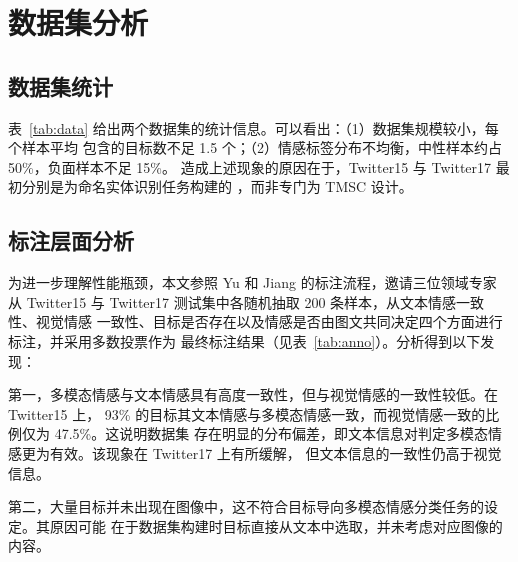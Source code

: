 \documentclass[12pt]{ctexart}
\begin{document}
\clearpage
\section{数据集分析}
\subsection{数据集统计}
表~\ref{tab:data} 给出两个数据集的统计信息。可以看出：（1）数据集规模较小，每个样本平均
包含的目标数不足 1.5 个；（2）情感标签分布不均衡，中性样本约占 50\%，负面样本不足 15\%。
造成上述现象的原因在于，Twitter15 与 Twitter17 最初分别是为命名实体识别任务构建的
\cite{zhang2018,lu2018}，而非专门为 TMSC 设计\cite{ye2023}。

\begin{table}[htbp]
\centering
\caption{两个数据集的统计信息（“均目标”指每个样本的平均目标数）\cite{ye2023}}
\label{tab:data}
\scriptsize
{}
\end{table}

\subsection{标注层面分析}
为进一步理解性能瓶颈，本文参照 Yu 和 Jiang\cite{yu2019} 的标注流程，邀请三位领域专家
从 Twitter15 与 Twitter17 测试集中各随机抽取 200 条样本，从文本情感一致性、视觉情感
一致性、目标是否存在以及情感是否由图文共同决定四个方面进行标注，并采用多数投票作为
最终标注结果（见表~\ref{tab:anno}）\cite{ye2023}。分析得到以下发现：

第一，多模态情感与文本情感具有高度一致性，但与视觉情感的一致性较低。在 Twitter15 上，
93\% 的目标其文本情感与多模态情感一致，而视觉情感一致的比例仅为 47.5\%。这说明数据集
存在明显的分布偏差，即文本信息对判定多模态情感更为有效。该现象在 Twitter17 上有所缓解，
但文本信息的一致性仍高于视觉信息。

第二，大量目标并未出现在图像中，这不符合目标导向多模态情感分类任务的设定。其原因可能
在于数据集构建时目标直接从文本中选取，并未考虑对应图像的内容\cite{yu2019}。
\end{document}
